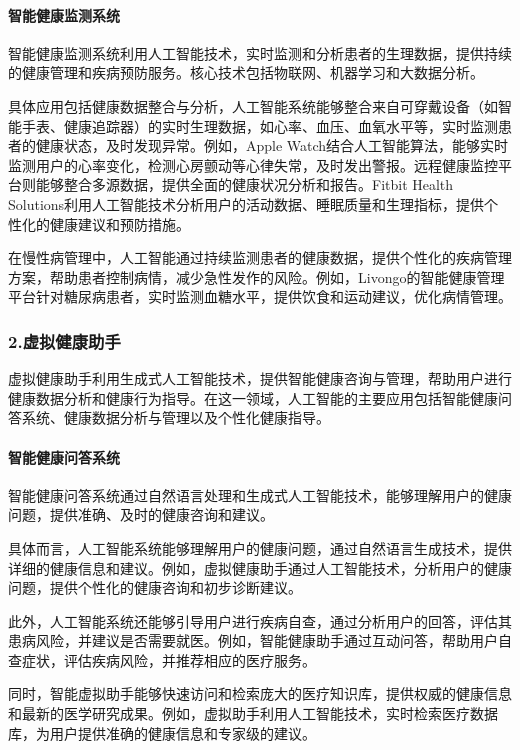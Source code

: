 \paragraph{智能健康监测系统}

智能健康监测系统利用人工智能技术，实时监测和分析患者的生理数据，提供持续的健康管理和疾病预防服务。核心技术包括物联网、机器学习和大数据分析。

具体应用包括健康数据整合与分析，人工智能系统能够整合来自可穿戴设备（如智能手表、健康追踪器）的实时生理数据，如心率、血压、血氧水平等，实时监测患者的健康状态，及时发现异常。例如，Apple Watch结合人工智能算法，能够实时监测用户的心率变化，检测心房颤动等心律失常，及时发出警报。远程健康监控平台则能够整合多源数据，提供全面的健康状况分析和报告。Fitbit Health Solutions利用人工智能技术分析用户的活动数据、睡眠质量和生理指标，提供个性化的健康建议和预防措施。

在慢性病管理中，人工智能通过持续监测患者的健康数据，提供个性化的疾病管理方案，帮助患者控制病情，减少急性发作的风险。例如，Livongo的智能健康管理平台针对糖尿病患者，实时监测血糖水平，提供饮食和运动建议，优化病情管理。

\subsubsection{2.虚拟健康助手}

虚拟健康助手利用生成式人工智能技术，提供智能健康咨询与管理，帮助用户进行健康数据分析和健康行为指导。在这一领域，人工智能的主要应用包括智能健康问答系统、健康数据分析与管理以及个性化健康指导。

\paragraph{智能健康问答系统}

智能健康问答系统通过自然语言处理和生成式人工智能技术，能够理解用户的健康问题，提供准确、及时的健康咨询和建议。

具体而言，人工智能系统能够理解用户的健康问题，通过自然语言生成技术，提供详细的健康信息和建议。例如，虚拟健康助手通过人工智能技术，分析用户的健康问题，提供个性化的健康咨询和初步诊断建议。

此外，人工智能系统还能够引导用户进行疾病自查，通过分析用户的回答，评估其患病风险，并建议是否需要就医。例如，智能健康助手通过互动问答，帮助用户自查症状，评估疾病风险，并推荐相应的医疗服务。

同时，智能虚拟助手能够快速访问和检索庞大的医疗知识库，提供权威的健康信息和最新的医学研究成果。例如，虚拟助手利用人工智能技术，实时检索医疗数据库，为用户提供准确的健康信息和专家级的建议。

